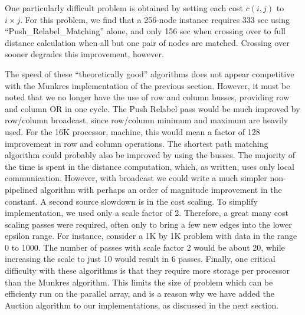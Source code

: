 One particularly difficult problem is obtained by setting each 
cost $c(i,j)$ to $i \times j$.  For this problem, we find that a 
256-node instance requires 333 sec using ``Push\_Relabel\_Matching'' 
alone, and only 156 sec when crossing over to full distance 
calculation when all but one pair of nodes are matched.  Crossing over sooner 
degrades this improvement, however.

The speed of these ``theoretically good'' algorithms
does not appear competitive with the Munkres implementation
of the previous section.  However, it must be noted that
we no longer have the use of
row and column busses, providing row and column OR in
one cycle.
The Push Relabel pass would
be much improved by row/column broadcast, since row/column
minimum and maximum are heavily used.
For the 16K processor, machine, this would mean a factor
of 128 improvement in row and column operations.
The shortest path matching algorithm could probably also be
improved by using the busses.
The majority of the time is spent in the distance computation,
which, as written, uses only local communication.  However,
with broadcast we could write a much simpler non-pipelined
algorithm with perhaps an order of magnitude improvement
in the constant.
A second source slowdown is in the cost scaling.  To
simplify implementation, we used only a scale factor
of 2.  Therefore, a great many cost scaling passes were
required, often only to bring a few new edges into the
lower epsilon range.  For instance, consider a 1K by 1K problem
with data in the range 0 to 1000.  The number of passes
with scale factor 2 would be about 20, while increasing
the scale to just 10 would result in 6 passes.
Finally, one critical difficulty with these algorithms
is that they require more storage per processor than
the Munkres algorithm.  This limits the size of problem
which can be efficienty run on the parallel array, and
is a reason why we have added the Auction algorithm
to our implementations, as discussed in the next section.
